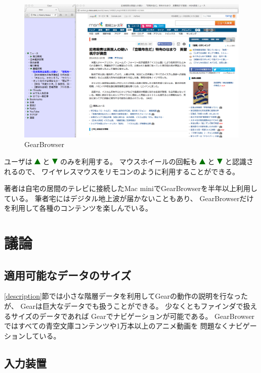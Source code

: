 \documentclass[twoside]{wiss}
\def\GEAR{\textsf{Gear}}
\def\GB{\textsf{GearBrowser}}
\def\up{ \includegraphics[width=3mm,bb=0 0 36 36]{figures/uptriangle.pdf} }
\def\down{ \includegraphics[width=3mm,bb=0 0 36 36]{figures/downtriangle.pdf} }
\begin{document}
\begin{figure}
\centerline{\includegraphics[width=160mm,bb=0 0 1401 872]{figures/ab4ff7c2d44f4af2bb94fae76589f495.png}}
\caption{\textsf{GearBrowser}}
\label{gearbrowser}
\end{figure}

ユーザは{\up}と{\down}のみを利用する。
マウスホイールの回転も{\up}と{\down}と認識されるので、
ワイヤレスマウスをリモコンのように利用することができる。

著者は自宅の居間のテレビに接続したMac miniで{\GB}を半年以上利用している。
筆者宅にはデジタル地上波が届かないこともあり、
{\GB}だけを利用して各種のコンテンツを楽しんでいる。

\section{議論}

\subsection{適用可能なデータのサイズ}

\ref{description}節では小さな階層データを利用して{\GEAR}の動作の説明を行なったが、
{\GEAR}は巨大なデータでも扱うことができる。
少なくともファインダで扱えるサイズのデータであれば
{\GEAR}でナビゲーションが可能である。
%
{\GB}ではすべての青空文庫コンテンツや1万本以上のアニメ動画を
問題なくナビゲーションしている。


\subsection{入力装置}
\end{document}
